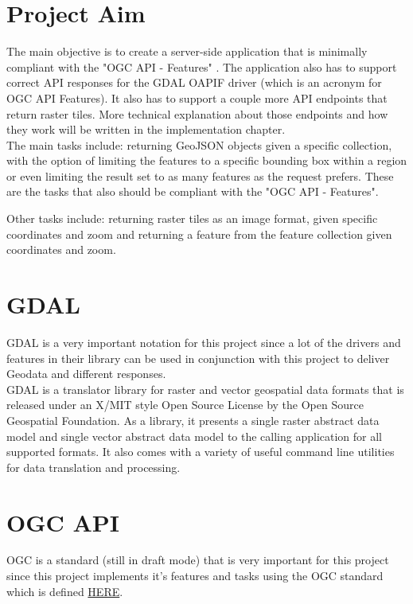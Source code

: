 \section{Project Aim}
The main objective is to create a server-side application that is minimally compliant with the "OGC API - Features" \cite{OGCApiFeatures}. The application also has to support correct API responses for the GDAL OAPIF \cite{OAPIF} driver (which is an acronym for OGC API Features). It also has to support a couple more API endpoints that return raster tiles. More technical explanation about those endpoints and how they work will be written in the implementation chapter.\\
\newline
The main tasks include: returning GeoJSON objects given a specific collection, with the option of limiting the features to a specific bounding box within a region or even limiting the result set to as many features as the request prefers. These are the tasks that also should be compliant with the "OGC API - Features".

Other tasks include: returning raster tiles as an image format, given specific coordinates and zoom and returning a feature from the feature collection given coordinates and zoom.

\section{GDAL}
GDAL is a very important notation for this project since a lot of the drivers and features in their library can be used in conjunction with this project to deliver Geodata and different responses.\\
\newline
GDAL is a translator library for raster and vector geospatial data formats that is released under an X/MIT style Open Source License by the Open Source Geospatial Foundation. As a library, it presents a single raster abstract data model and single vector abstract data model to the calling application for all supported formats. It also comes with a variety of useful command line utilities for data translation and processing. \cite{WhatIsGDAL}

\section{OGC API}
OGC is a standard (still in draft mode) that is very important for this project since this project implements it's features and tasks using the OGC standard which is defined \href{https://docs.opengeospatial.org/DRAFTS/17-069r1.html#webapi}{HERE}.

